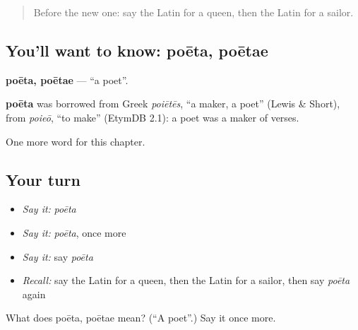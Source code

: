 \label{lesson:LA-C73-poeta}



\begin{quote}
Before the new one: say the Latin for a queen, then the Latin for a sailor.
\end{quote}

\subsection*{You'll want to know: poēta, poētae}
\textbf{poēta, poētae} — \textquotedblleft{}a poet\textquotedblright{}.

\begin{cousinweb}
\textbf{poēta} was borrowed from Greek \emph{poiētēs}, \textquotedblleft{}a maker, a poet\textquotedblright{} (Lewis \& Short), from \emph{poieō}, \textquotedblleft{}to make\textquotedblright{} (EtymDB 2.1): a poet was a maker of verses.
\end{cousinweb}

\begin{grammarlens}[title={What you've built}]
One more word for this chapter.
\end{grammarlens}

\subsection*{Your turn}
\begin{itemize}
\raggedright
  \item \emph{Say it:} \emph{poēta}
  \item \emph{Say it:} \emph{poēta}, once more
  \item \emph{Say it:} say \emph{poēta}
  \item \emph{Recall:} say the Latin for a queen, then the Latin for a sailor, then say \emph{poēta} again
\end{itemize}

\begin{tcolorbox}[breakable,colback=teal!4,colframe=teal!35!black,title={Before you move on}]
What does poēta, poētae mean? (\textquotedblleft{}A poet\textquotedblright{}.) Say it once more.
\end{tcolorbox}
